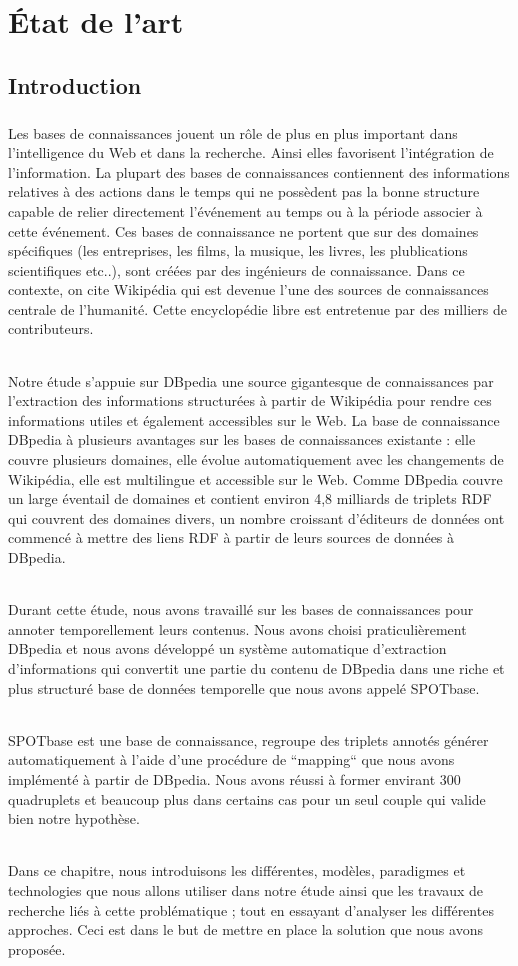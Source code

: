 \documentclass[12pt,a4]{report}
\begin{document}
\chapter{État de l'art}
\section{Introduction}
\paragraph{}
Les bases de connaissances jouent un rôle de plus en plus important dans l'intelligence du Web et dans la recherche. Ainsi elles favorisent l'intégration de l'information. La plupart des bases de connaissances contiennent des informations relatives à des actions dans le temps qui ne possèdent pas la bonne structure capable de relier directement l'événement au temps ou à la période associer à cette événement.
Ces bases de connaissance ne portent que sur des domaines spécifiques (les entreprises, les films, la musique, les livres, les plublications scientifiques etc..), sont créées par des ingénieurs de connaissance. Dans ce contexte, on cite Wikipédia qui est devenue l'une des sources de connaissances centrale de l'humanité. Cette encyclopédie libre est entretenue par des milliers de contributeurs.
\subparagraph{}
Notre étude s'appuie sur DBpedia une source gigantesque de connaissances par l'extraction des informations structurées à partir de Wikipédia pour rendre ces informations utiles et également accessibles sur le Web. La base de connaissance DBpedia à plusieurs avantages sur les bases de connaissances existante : elle couvre plusieurs domaines, elle évolue automatiquement avec les changements de Wikipédia, elle est multilingue et accessible sur le Web. 
Comme DBpedia couvre un large éventail de domaines et contient environ 4,8 milliards de triplets RDF qui couvrent des domaines divers, un nombre croissant d'éditeurs de données ont commencé à mettre des liens RDF à partir de leurs sources de données à DBpedia.
\subparagraph{}
Durant cette étude, nous avons travaillé sur les bases de connaissances pour annoter temporellement leurs contenus. Nous avons choisi praticulièrement DBpedia et nous avons développé un système automatique d'extraction d'informations qui convertit une partie du contenu de DBpedia dans une riche et plus structuré base de données temporelle que nous avons appelé SPOTbase.
\subparagraph{}
SPOTbase est une base de connaissance, regroupe des triplets annotés générer automatiquement à l'aide d'une procédure de ``mapping`` que nous avons implémenté à partir de DBpedia.
Nous avons réussi à former envirant 300 quadruplets et beaucoup plus dans certains cas pour un seul couple qui valide bien notre hypothèse.
\subparagraph{}
Dans ce chapitre, nous introduisons les différentes, modèles, paradigmes et technologies que nous allons utiliser dans notre étude ainsi que les travaux de recherche liés à cette problématique ; tout en essayant d'analyser les différentes approches. Ceci est dans le but de mettre en place la solution que nous avons proposée.
\end{document}
